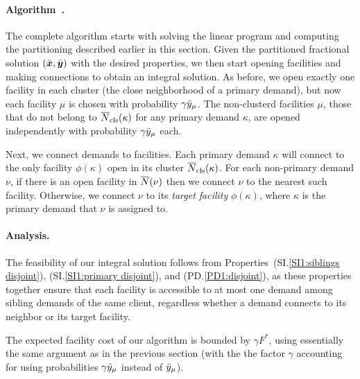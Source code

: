 
\paragraph{Algorithm~{\EBGS}.}
The complete algorithm starts with solving the linear program and
computing the partitioning described earlier in this section.
Given the partitioned fractional solution $(\bar{\boldsymbol{x}},
\bar{\boldsymbol{y}})$ with the desired properties, we then start opening
facilities and making connections to obtain an integral
solution. As before, we open exactly one facility in each
cluster (the close neighborhood of a primary demand), but
now each facility $\mu$ is chosen with probability
$\gamma{\bar y}_{\mu}$. The non-clusterd facilities $\mu$,
those that do not belong to ${\overline{N}}_{\text{cls}}(\kappa)$ for any
primary demand $\kappa$, are opened independently with
probability $\gamma{\bar y}_{\mu}$ each. 

Next, we connect demands to facilities.
Each primary demand $\kappa$ will connect
to the only facility $\phi(\kappa)$ open in its cluster
${\overline{N}}_{\text{cls}}(\kappa)$.  For each non-primary demand $\nu$, if
there is an open facility in ${\overline{N}}(\nu)$ then we connect
$\nu$ to the nearest such facility. Otherwise, we connect
$\nu$ to its \emph{target facility} $\phi(\kappa)$, where $\kappa$ is the primary
demand that $\nu$ is assigned to. 


\paragraph{Analysis.}
The feasibility of our integral solution follows from
Properties~(SI.\ref{SI1:siblings disjoint}), (SI.\ref{SI1:primary
  disjoint}), and (PD.\ref{PD1:disjoint}), as these properties together
ensure that each facility is accessible to at most one demand among
sibling demands of the same client, regardless whether a demand
connects to its neighbor or its target facility.

The expected facility cost of our algorithm is bounded by
$\gamma F^\ast$, using essentially the same argument as in
the previous section (with the the factor $\gamma$
accounting for using probabilities $\gamma {\bar y}_{\mu}$
instead of ${\bar y}_{\mu}$).


